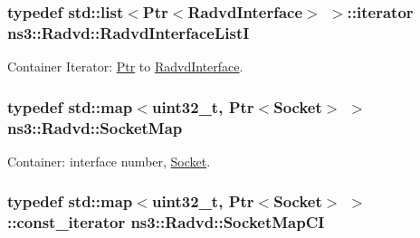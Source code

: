 \subsubsection[{\texorpdfstring{Radvd\+Interface\+ListI}{RadvdInterfaceListI}}]{\setlength{\rightskip}{0pt plus 5cm}typedef {\bf std\+::list}$<${\bf Ptr}$<${\bf Radvd\+Interface}$>$ $>$\+::iterator {\bf ns3\+::\+Radvd\+::\+Radvd\+Interface\+ListI}\hspace{0.3cm}{\ttfamily [private]}}\hypertarget{classns3_1_1Radvd_aa7ed6393ad16abdc7f3a37e18db424c4}{}\label{classns3_1_1Radvd_aa7ed6393ad16abdc7f3a37e18db424c4}


Container Iterator\+: \hyperlink{classns3_1_1Ptr}{Ptr} to \hyperlink{classns3_1_1RadvdInterface}{Radvd\+Interface}. 

\subsubsection[{\texorpdfstring{Socket\+Map}{SocketMap}}]{\setlength{\rightskip}{0pt plus 5cm}typedef std\+::map$<$uint32\+\_\+t, {\bf Ptr}$<${\bf Socket}$>$ $>$ {\bf ns3\+::\+Radvd\+::\+Socket\+Map}\hspace{0.3cm}{\ttfamily [private]}}\hypertarget{classns3_1_1Radvd_a58b325c83c73d2054a896868cc2f5d7b}{}\label{classns3_1_1Radvd_a58b325c83c73d2054a896868cc2f5d7b}


Container\+: interface number, \hyperlink{classns3_1_1Socket}{Socket}. 

\subsubsection[{\texorpdfstring{Socket\+Map\+CI}{SocketMapCI}}]{\setlength{\rightskip}{0pt plus 5cm}typedef std\+::map$<$uint32\+\_\+t, {\bf Ptr}$<${\bf Socket}$>$ $>$\+::const\+\_\+iterator {\bf ns3\+::\+Radvd\+::\+Socket\+Map\+CI}\hspace{0.3cm}{\ttfamily [private]}}\hypertarget{classns3_1_1Radvd_aaf9bb5cc49e74d40eced93ed630a0cd4}{}\label{classns3_1_1Radvd_aaf9bb5cc49e74d40eced93ed630a0cd4}



